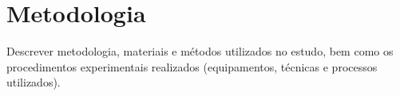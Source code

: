 \chapter{Metodologia}
\label{cap:03}

Descrever metodologia, materiais e métodos utilizados no estudo, bem como os procedimentos experimentais realizados (equipamentos,
técnicas e processos utilizados).
